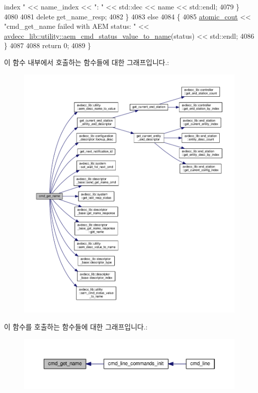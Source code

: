 \begin{DoxyCode}
{       index "} << name\_index << \textcolor{stringliteral}{": "} << std::dec << name << std::endl;
4079         \}
4080 
4081         \textcolor{keyword}{delete} get\_name\_resp;
4082     \}
4083     \textcolor{keywordflow}{else}
4084     \{
4085         \hyperlink{cmd__line_8h_a0bc38ccc65c79ba06c6fcd7b4bf554c3}{atomic\_cout} << \textcolor{stringliteral}{"cmd\_get\_name failed with AEM status: "} << 
      \hyperlink{namespaceavdecc__lib_1_1utility_aca66a547b66fdb27f3221ad0844d60c6}{avdecc\_lib::utility::aem\_cmd\_status\_value\_to\_name}(status) 
      << std::endl;
4086     \}
4087 
4088     \textcolor{keywordflow}{return} 0;
4089 \}
\end{DoxyCode}


이 함수 내부에서 호출하는 함수들에 대한 그래프입니다.\+:
\nopagebreak
\begin{figure}[H]
\begin{center}
\leavevmode
\includegraphics[width=350pt]{classcmd__line_a33941d08707eaa3e1eb57910a2e67de3_cgraph}
\end{center}
\end{figure}




이 함수를 호출하는 함수들에 대한 그래프입니다.\+:
\nopagebreak
\begin{figure}[H]
\begin{center}
\leavevmode
\includegraphics[width=350pt]{classcmd__line_a33941d08707eaa3e1eb57910a2e67de3_icgraph}
\end{center}
\end{figure}


